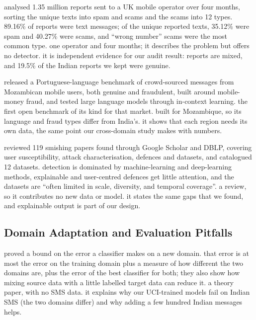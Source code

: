   analysed 1.35 million reports sent to a UK mobile operator over four months, sorting the unique texts into spam and scams and the scams into 12 types.  89.16\% of reports were text messages; of the unique reported texts, 35.12\% were spam and 40.27\% were scams, and ``wrong number'' scams were the most common type.  one operator and four months; it describes the problem but offers no detector.  it is independent evidence for our audit result: reports are mixed, and 19.5\% of the Indian reports we kept were genuine.

  released a Portuguese-language benchmark of crowd-sourced messages from Mozambican mobile users, both genuine and fraudulent, built around mobile-money fraud, and tested large language models through in-context learning.  the first open benchmark of its kind for that market.  built for Mozambique, so its language and fraud types differ from India's.  it shows that each region needs its own data, the same point our cross-domain study makes with numbers.

  reviewed 119 smishing papers found through Google Scholar and DBLP, covering user susceptibility, attack characterisation, defences and datasets, and catalogued 12 datasets.  detection is dominated by machine-learning and deep-learning methods, explainable and user-centred defences get little attention, and the datasets are ``often limited in scale, diversity, and temporal coverage''.  a review, so it contributes no new data or model.  it states the same gaps that we found, and explainable output is part of our design.

\subsection{Domain Adaptation and Evaluation Pitfalls}

  proved a bound on the error a classifier makes on a new domain.  that error is at most the error on the training domain plus a measure of how different the two domains are, plus the error of the best classifier for both; they also show how mixing source data with a little labelled target data can reduce it.  a theory paper, with no SMS data.  it explains why our UCI-trained models fail on Indian SMS (the two domains differ) and why adding a few hundred Indian messages helps.

